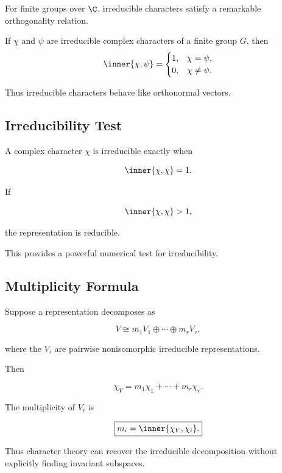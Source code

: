 For finite groups over \(\C\), irreducible characters satisfy a remarkable
orthogonality relation.

\begin{theorem}
If \(\chi\) and \(\psi\) are irreducible complex characters of a finite
group \(G\), then
\[ \inner{\chi,\psi}=
\begin{cases}
1,&\chi=\psi,\\
0,&\chi\neq\psi.
\end{cases} \]
\end{theorem}

Thus irreducible characters behave like orthonormal vectors.

\subsection{Irreducibility Test}
\label{subsec:character-irreducibility-test}

A complex character \(\chi\) is irreducible exactly when

\[ \inner{\chi,\chi}=1. \]

If

\[ \inner{\chi,\chi}>1, \]

the representation is reducible.

This provides a powerful numerical test for irreducibility.

\subsection{Multiplicity Formula}
\label{subsec:character-multiplicity}

Suppose a representation decomposes as

\[ V\cong m_1V_1\oplus\cdots\oplus m_rV_r, \]

where the \(V_i\) are pairwise nonisomorphic irreducible representations.

Then

\[ \chi_V=m_1\chi_1+\cdots+m_r\chi_r. \]

The multiplicity of \(V_i\) is

\[ \boxed{m_i=\inner{\chi_V,\chi_i}.} \]

Thus character theory can recover the irreducible decomposition without
explicitly finding invariant subspaces.

